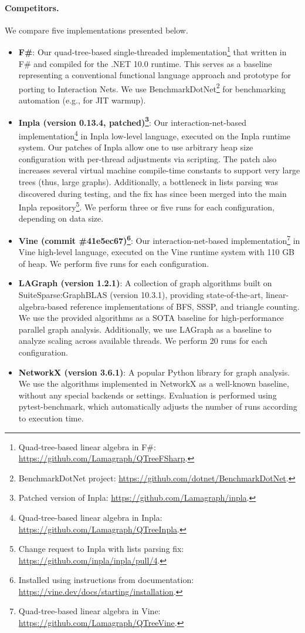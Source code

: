 \paragraph{Competitors.}
We compare five implementations presented below.
\begin{itemize}
    \item \textbf{F\#}: Our quad-tree-based single-threaded implementation\footnote{Quad-tree-based linear algebra in F\#: \url{https://github.com/Lamagraph/QTreeFSharp}.} that written in F\# and compiled for the .NET 10.0 runtime.
    This serves as a baseline representing a conventional functional language approach and prototype for porting to Interaction Nets.
    We use BenchmarkDotNet\footnote{BenchmarkDotNet project: \url{https://github.com/dotnet/BenchmarkDotNet}.} for benchmarking automation (e.g., for JIT warmup).
	\item \textbf{Inpla (version 0.13.4, patched)\footnote{Patched version of Inpla: \url{https://github.com/Lamagraph/inpla}.}}: Our interaction-net-based implementation\footnote{Quad-tree-based linear algebra in Inpla: \url{https://github.com/Lamagraph/QTreeInpla}.} in Inpla low-level language, executed on the Inpla runtime system.
	Our patches of Inpla allow one to use arbitrary heap size configuration with per-thread adjustments via scripting.
    The patch also increases several virtual machine compile-time constants to support very large trees (thus, large graphs).
    Additionally, a bottleneck in lists parsing was discovered during testing, and the fix has since been merged into the main Inpla repository\footnote{Change request to Inpla with lists parsing fix: \url{https://github.com/inpla/inpla/pull/4}.}.
    We perform three or five runs for each configuration, depending on data size.
    \item \textbf{Vine (commit \#41e5ec67)\footnote{Installed using instructions from documentation: \url{https://vine.dev/docs/starting/installation}.}}: Our interaction-net-based implementation\footnote{Quad-tree-based linear algebra in Vine: \url{https://github.com/Lamagraph/QTreeVine}.} in Vine high-level language, executed on the Vine runtime system with 110 GB of heap. We perform five runs for each configuration.
    \item \textbf{LAGraph\cite{8778338} (version 1.2.1)}: A collection of graph algorithms built on SuiteSparse:GraphBLAS (version 10.3.1), providing state-of-the-art, linear-algebra-based reference implementations of BFS, SSSP, and triangle counting. 
    We use the provided algorithms as a SOTA baseline for high-performance parallel graph analysis. 
    Additionally, we use LAGraph as a baseline to analyze scaling across available threads. 
    We perform 20 runs for each configuration.
    \item \textbf{NetworkX (version 3.6.1)}: A popular Python library for graph analysis.
We use the algorithms implemented in NetworkX as a well-known baseline, without any special backends or settings.
Evaluation is performed using pytest-benchmark, which automatically adjusts the number of runs according to execution time.
\end{itemize}

